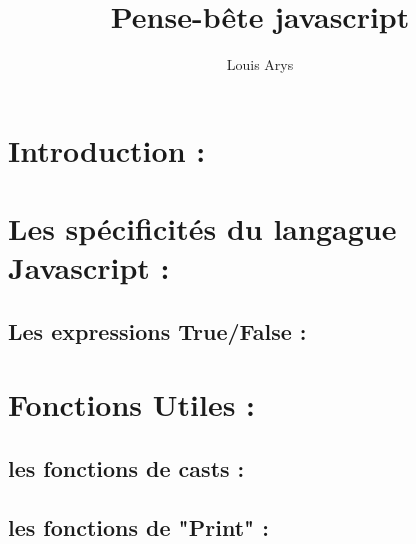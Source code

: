 \documentclass[a4paper, 11pt]{scrarticle}
\title{Pense-bête javascript}
\author{Louis Arys}
\begin{document}
\maketitle
\tableofcontents

\section{Introduction : }

\section{Les spécificités du langague Javascript :}

\subsection{Les expressions True/False :}

\section{Fonctions Utiles : }

\subsection{les fonctions de casts :}

\subsection{les fonctions de "Print" :}
\end{document}
